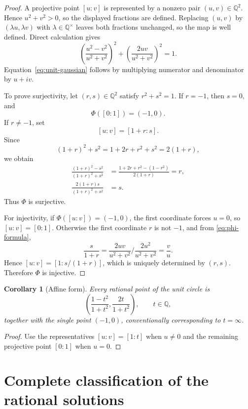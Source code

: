 \documentclass[11pt,a4paper]{article}
\numberwithin{equation}{section}
\newtheorem{corollary}[theorem]{Corollary}
\theoremstyle{definition}
\theoremstyle{remark}
\newcommand{\Q}{\mathbb Q}
\begin{document}
\begin{proof}
A projective point $[u:v]$ is represented by a nonzero pair $(u,v)\in\Q^2$. Hence $u^2+v^2>0$, so the displayed fractions are defined. Replacing $(u,v)$ by $(\lambda u,\lambda v)$ with $\lambda\in\Q^\times$ leaves both fractions unchanged, so the map is well defined. Direct calculation gives
\[
 \left(\frac{u^2-v^2}{u^2+v^2}\right)^2
 +\left(\frac{2uv}{u^2+v^2}\right)^2
 =1.
\]
Equation~\eqref{eq:unit-gaussian} follows by multiplying numerator and denominator by $u+iv$.

To prove surjectivity, let $(r,s)\in\Q^2$ satisfy $r^2+s^2=1$. If $r=-1$, then $s=0$, and
\[
 \Phi([0:1])=(-1,0).
\]
If $r\neq-1$, set
\[
 [u:v]=[1+r:s].
\]
Since
\[
 (1+r)^2+s^2
 =1+2r+r^2+s^2
 =2(1+r),
\]
we obtain
\begin{align*}
 \frac{(1+r)^2-s^2}{(1+r)^2+s^2}
 &=\frac{1+2r+r^2-(1-r^2)}{2(1+r)}
 =r,\\
 \frac{2(1+r)s}{(1+r)^2+s^2}
 &=s.
\end{align*}
Thus $\Phi$ is surjective.

For injectivity, if $\Phi([u:v])=(-1,0)$, the first coordinate forces $u=0$, so $[u:v]=[0:1]$. Otherwise the first coordinate $r$ is not $-1$, and from \eqref{eq:phi-formula},
\[
 \frac{s}{1+r}
 =\frac{2uv}{u^2+v^2}
   \bigg/
  \frac{2u^2}{u^2+v^2}
 =\frac vu.
\]
Hence $[u:v]=[1:s/(1+r)]$, which is uniquely determined by $(r,s)$. Therefore $\Phi$ is injective.
\end{proof}

\begin{corollary}[Affine form]
\label{cor:unit-circle-affine}
Every rational point of the unit circle is
\begin{equation}
 \left(
 \frac{1-t^2}{1+t^2},
 \frac{2t}{1+t^2}
 \right),
 \qquad t\in\Q,
 \label{eq:unit-affine}
\end{equation}
together with the single point $(-1,0)$, conventionally corresponding to $t=\infty$.
\end{corollary}

\begin{proof}
Use the representatives $[u:v]=[1:t]$ when $u\neq0$ and the remaining projective point $[0:1]$ when $u=0$.
\end{proof}

\section{Complete classification of the rational solutions}
\label{sec:rational-classification}
\end{document}

